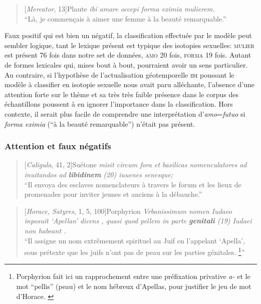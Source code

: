 \begin{quote}[\textit{Mercator}, 13]{Plaute}
    \textit{ibi amare occepi forma eximia mulierem.} \\
    \enquote{Là, je commençais à aimer une femme à la beauté remarquable.}
\end{quote}

Faux positif qui est bien un négatif, la classification effectuée par le modèle peut sembler logique, tant le lexique présent est typique des isotopies sexuelles: \textsc{mulier} est présent 76 fois dans notre set de données, \textsc{amo} 20 fois, \textsc{forma} 19 fois. Autant de formes lexicales qui, mises bout à bout, pourraient avoir un sens particulier. Au contraire, si l'hypothèse de l'actualisation géotemporelle \textsc{ibi} poussant le modèle à classifier en isotopie sexuelle nous avait paru alléchante, l'absence d'une attention forte sur le thème et sa très très faible présence dans le corpus des échantillons poussent à en ignorer l'importance dans la classification. Hors contexte, il serait plus facile de comprendre une interprétation d'\textit{amo}=\textit{futuo} si \textit{forma eximia} (\enquote{à la beauté remarquable}) n'était pas présent.

\subsubsection{Attention et faux négatifs}

\begin{quote}[\textit{Caligula}, 41, 2]{Suétone}
    \textit{misit circum fora et basilicas nomenculatores ad inuitandos ad \textbf{libidinem} (20) iuuenes senesque;} \\
    \enquote{Il envoya des esclaves nomenclateurs à travers le forum et les lieux de promenades pour inviter jeunes et anciens à la débauche.}
\end{quote}

\begin{quote}[\textit{Horace, Satyres}, 1, 5, 100]{Porphyrion}
    \textit{Vrbanissimum nomen Iudaeo inposuit ‘Apellan’ dicens , quasi quod pellem in parte \textbf{genitali} (19) Iudaei non habeant .} \\
    \enquote{Il assigne un nom extrêmement spirituel au Juif en l'appelant ‘Apella’, sous prétexte que les juifs n'ont pas de peau sur les parties génitales. \footnote{Porphyrion fait ici un rapprochement entre une préfixation privative \textit{a-} et le mot ``pellis'' (peau) et le nom hébreux d'Apellas, pour justifier le jeu de mot d'Horace. \textcite{cordier2001romains}}}
\end{quote}

